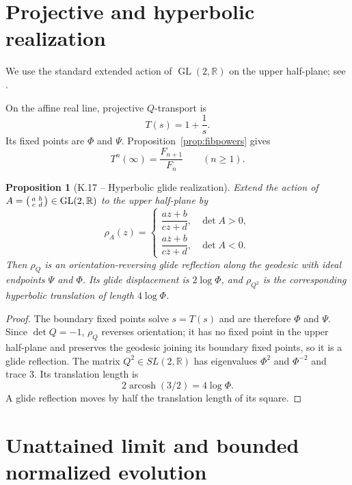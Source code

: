 \documentclass[11pt,letterpaper]{article}
\theoremstyle{kernelstyle}
\newtheorem{proposition}[theorem]{Proposition}
\newcommand{\R}{\mathbb{R}}
\newcommand{\GL}{\operatorname{GL}}
\begin{document}
\section{Projective and hyperbolic realization}\label{sec:hyperbolic}

We use the standard extended action of $\GL(2,\R)$ on the upper half-plane; see \cite{Beardon,Lang}.

On the affine real line, projective $Q$-transport is
\begin{equation}\label{eq:mobius}
T(s)=1+\frac1s.
\end{equation}
Its fixed points are $\Phi$ and $\Psi$.  Proposition~\ref{prop:fibpowers} gives
\begin{equation}\label{eq:orbit}
T^n(\infty)=\frac{F_{n+1}}{F_n}
\qquad(n\ge1).
\end{equation}

\begin{proposition}[K.17 -- Hyperbolic glide realization]\label{prop:glide}
Extend the action of $A=\begin{psmallmatrix}a&b\\c&d\end{psmallmatrix}\in\GL(2,\R)$ to the upper half-plane by
\begin{equation}
\rho_A(z)=
\begin{cases}
\dfrac{az+b}{cz+d},&\det A>0,\\[6pt]
\dfrac{a\overline z+b}{c\overline z+d},&\det A<0.
\end{cases}
\end{equation}
Then $\rho_Q$ is an orientation-reversing glide reflection along the geodesic with ideal endpoints $\Psi$ and $\Phi$.  Its glide displacement is $2\log\Phi$, and $\rho_{Q^2}$ is the corresponding hyperbolic translation of length $4\log\Phi$.
\end{proposition}

\begin{proof}
The boundary fixed points solve $s=T(s)$ and are therefore $\Phi$ and $\Psi$.  Since $\det Q=-1$, $\rho_Q$ reverses orientation; it has no fixed point in the upper half-plane and preserves the geodesic joining its boundary fixed points, so it is a glide reflection.  The matrix $Q^2\in SL(2,\R)$ has eigenvalues $\Phi^2$ and $\Phi^{-2}$ and trace $3$.  Its translation length is
\[
2\operatorname{arcosh}(3/2)=4\log\Phi.
\]
A glide reflection moves by half the translation length of its square.
\end{proof}

\section{Unattained limit and bounded normalized evolution}\label{sec:bounded}
\end{document}
